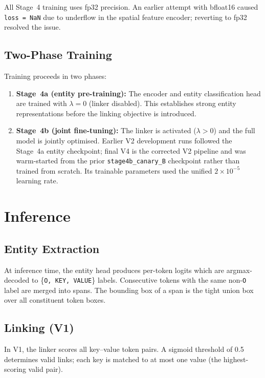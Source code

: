 All Stage~4 training uses fp32 precision. An earlier attempt with bfloat16
caused \texttt{loss~=~NaN} due to underflow in the spatial feature encoder;
reverting to fp32 resolved the issue.

\subsection{Two-Phase Training}
\label{sec:two-phase}

Training proceeds in two phases:
\begin{enumerate}
  \item \textbf{Stage~4a (entity pre-training):} The encoder and entity
  classification head are trained with $\lambda = 0$ (linker disabled).
  This establishes strong entity representations before the linking
  objective is introduced.
  \item \textbf{Stage~4b (joint fine-tuning):} The linker is activated
  ($\lambda > 0$) and the full model is jointly optimised. Earlier V2
  development runs followed the Stage~4a entity checkpoint; final V4 is the
  corrected V2 pipeline and was warm-started from the prior
  \texttt{stage4b\_canary\_B} checkpoint rather than trained from scratch.
  Its trainable parameters used the unified $2\times10^{-5}$ learning rate.
\end{enumerate}

\section{Inference}
\label{sec:inference}

\subsection{Entity Extraction}
\label{sec:greedy-decoding}

At inference time, the entity head produces per-token logits which are
argmax-decoded to \{\texttt{O, KEY, VALUE}\} labels. Consecutive tokens with
the same non-\texttt{O} label are merged into spans. The bounding box of a
span is the tight union box over all constituent token boxes.

\subsection{Linking (V1)}
\label{sec:v1-linking-inference}

In V1, the linker scores all key--value token pairs. A sigmoid threshold of
0.5 determines valid links; each key is matched to at most one value (the
highest-scoring valid pair).

